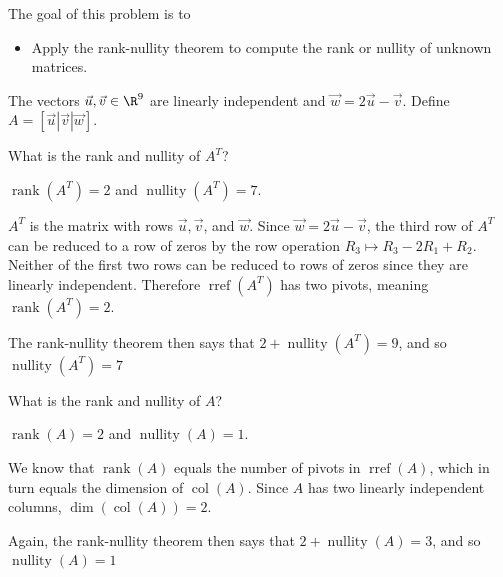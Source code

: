 \documentclass{problemset}
\DeclareMathOperator{\Rref}{rref}
\DeclareMathOperator{\Rank}{rank}
\DeclareMathOperator{\Nullity}{nullity}
\DeclareMathOperator{\Dim}{dim}
\DeclareMathOperator{\Col}{col}
\newcommand{\rref}{\Rref}
\begin{document}
	\question
	\begin{annotation}
		\begin{goals}

			The goal of this problem is to
			\begin{itemize}
				\item Apply the rank-nullity theorem to compute the rank or nullity of unknown matrices.
			\end{itemize}
		\end{goals}
	\end{annotation}
	The vectors $\vec u,\vec v\in\R^9$ are linearly independent and $\vec w=2\vec u-\vec v$.
	Define $A=[\vec u|\vec v|\vec w]$.
	\begin{parts}
		\item What is the rank and nullity of $A^T$?
			\begin{solution}
				$\Rank(A^T)=2$ and $\Nullity(A^T)=7$.

				$A^T$ is the matrix with rows $\vec u,\vec v$, and $\vec w$.
				Since $\vec w=2\vec u-\vec v$, the third row of $A^T$ can be
				reduced to a row of zeros by the row operation
				$R_3\mapsto R_3-2R_1+R_2$. Neither of the first two rows can be
				reduced to rows of zeros since they are linearly independent.
				Therefore $\rref(A^T)$ has two pivots, meaning $\Rank(A^T)=2$.

				The rank-nullity theorem then says that $2+\Nullity(A^T)=9$, and so
				$\Nullity(A^T)=7$
			\end{solution}
		\item What is the rank and nullity of $A$?
			\begin{solution}
				$\Rank(A)=2$ and $\Nullity(A)=1$.

				We know that $\Rank(A)$ equals the number of pivots in $\rref(A)$,
				which in turn equals the dimension of $\Col(A)$. Since $A$ has two
				linearly independent columns, $\Dim(\Col(A))=2$.

				Again, the rank-nullity theorem then says that $2+\Nullity(A)=3$,
				and so $\Nullity(A)=1$
			\end{solution}
	\end{parts}
\end{document}
